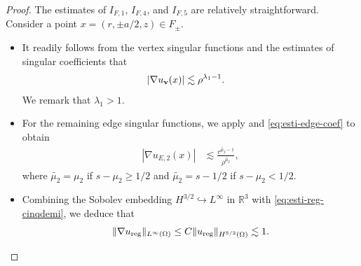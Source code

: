﻿\documentclass[11pt,reqno,oneside]{amsart}
\theoremstyle{definition}
\theoremstyle{remark}
\newcommand{\R}{\mathbb{R}}
\newcommand{\n}{\nabla}
\newcommand{\g}{\gamma}
\newcommand{\vf}{\varphi}
\newcommand{\lm}{\lambda}
\renewcommand{\t}{\theta}
\newcommand{\p}{\partial}
\begin{document}
\begin{proof}
            The estimates of $I_{F,1}$, $I_{F,4}$, and $I_{F,5}$ are relatively straightforward. Consider a point $x=(r,\pm a/2, z)\in F_\pm$.
            \begin{itemize}
                \item It readily follows from the vertex singular functions and the estimates of singular coefficients that
            \begin{align*}
                |\n u_{\bf v}(x)| & \lesssim \rho^{\lm_1-1}.
            \end{align*}
            We remark that $\lm_1>1$.
            \item For the remaining edge singular functions, we apply  and \eqref{eq:esti-edge-coef} to obtain
            \begin{align*}
                |\n u_{E,2}(x)| & \lesssim \frac{r^{\widetilde{\mu_2}-1}}{\rho^{\widetilde{\mu_2}}},
            \end{align*}
            where $\widetilde{\mu_2}=\mu_2$ if $s-\mu_2\geq 1/2$ and $\widetilde{\mu_2}=s-1/2$ if $s-\mu_2< 1/2$.
            \item Combining the Sobolev embedding $H^{3/2}\hookrightarrow L^\infty$ in $\R^3$ with \eqref{eq:esti-reg-cinqdemi}, we deduce that
            \begin{align}\label{eq:esti-reg-infinity}
                \|\n u_{\rm reg}\|_{L^\infty(\Omega)} \leq C \|u_{\rm reg}\|_{H^{5/2}(\Omega)} \lesssim 1.
            \end{align}
            \end{itemize} 


\end{proof}
\end{document}

